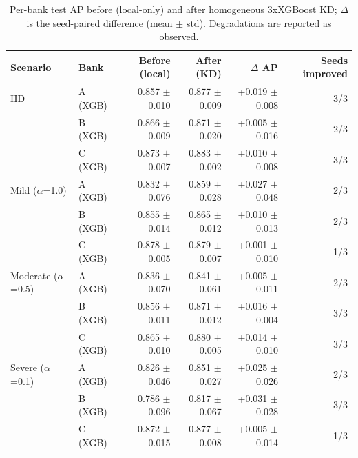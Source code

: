 \begin{table}[t]
\centering
\scriptsize
\caption{Per-bank test AP before (local-only) and after homogeneous 3xXGBoost KD; $\Delta$ is the seed-paired difference (mean $\pm$ std). Degradations are reported as observed.}
\label{tab:perbank}
\begin{tabular}{llrrrr}
\toprule
Scenario & Bank & Before (local) & After (KD) & $\Delta$ AP & Seeds improved \\
\midrule
IID & A (XGB) & 0.857 $\pm$ 0.010 & 0.877 $\pm$ 0.009 & +0.019 $\pm$ 0.008 & 3/3 \\
 & B (XGB) & 0.866 $\pm$ 0.009 & 0.871 $\pm$ 0.020 & +0.005 $\pm$ 0.016 & 2/3 \\
 & C (XGB) & 0.873 $\pm$ 0.007 & 0.883 $\pm$ 0.002 & +0.010 $\pm$ 0.008 & 3/3 \\
\midrule
Mild ($\alpha$=1.0) & A (XGB) & 0.832 $\pm$ 0.076 & 0.859 $\pm$ 0.028 & +0.027 $\pm$ 0.048 & 2/3 \\
 & B (XGB) & 0.855 $\pm$ 0.014 & 0.865 $\pm$ 0.012 & +0.010 $\pm$ 0.013 & 2/3 \\
 & C (XGB) & 0.878 $\pm$ 0.005 & 0.879 $\pm$ 0.007 & +0.001 $\pm$ 0.010 & 1/3 \\
\midrule
Moderate ($\alpha$=0.5) & A (XGB) & 0.836 $\pm$ 0.070 & 0.841 $\pm$ 0.061 & +0.005 $\pm$ 0.011 & 2/3 \\
 & B (XGB) & 0.856 $\pm$ 0.011 & 0.871 $\pm$ 0.012 & +0.016 $\pm$ 0.004 & 3/3 \\
 & C (XGB) & 0.865 $\pm$ 0.010 & 0.880 $\pm$ 0.005 & +0.014 $\pm$ 0.010 & 3/3 \\
\midrule
Severe ($\alpha$=0.1) & A (XGB) & 0.826 $\pm$ 0.046 & 0.851 $\pm$ 0.027 & +0.025 $\pm$ 0.026 & 2/3 \\
 & B (XGB) & 0.786 $\pm$ 0.096 & 0.817 $\pm$ 0.067 & +0.031 $\pm$ 0.028 & 3/3 \\
 & C (XGB) & 0.872 $\pm$ 0.015 & 0.877 $\pm$ 0.008 & +0.005 $\pm$ 0.014 & 1/3 \\
\bottomrule
\end{tabular}
\end{table}
